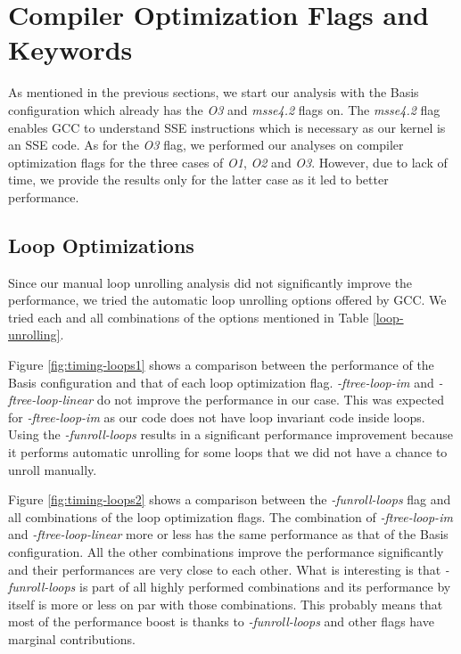 \documentclass{article}
\begin{document}
\section{Compiler Optimization Flags and Keywords}

As mentioned in the previous sections, we start our analysis with the Basis configuration which already has the \textit{O3} and \textit{msse4.2} flags on. The \textit{msse4.2} flag enables GCC to understand SSE instructions which is necessary as our kernel is an SSE code. As for the \textit{O3} flag, we performed our analyses on compiler optimization flags for the three cases of \textit{O1},  \textit{O2} and \textit{O3}. However, due to lack of time, we provide the results only for the latter case as it led to better performance.

\subsection{Loop Optimizations}

Since our manual loop unrolling analysis did not significantly improve the performance, we tried the automatic loop unrolling options offered by GCC. We tried each and all combinations of the options mentioned in Table \ref{loop-unrolling}. 

Figure \ref{fig:timing-loops1} shows a comparison between the performance of the Basis configuration and that of each loop optimization flag. \textit{-ftree-loop-im} and \textit{-ftree-loop-linear} do not improve the performance in our case. This was expected for  \textit{-ftree-loop-im} as our code does not have loop invariant code inside loops. Using the \textit{-funroll-loops} results in a significant performance improvement because it performs automatic unrolling for some loops that we did not have a chance to unroll manually. 

Figure \ref{fig:timing-loops2} shows a comparison between the \textit{-funroll-loops} flag and all combinations of the loop optimization flags. The combination of \textit{-ftree-loop-im} and \textit{-ftree-loop-linear} more or less has the same performance as that of the Basis configuration. All the other combinations improve the performance significantly and their performances are very close to each other. What is interesting is that \textit{-funroll-loops} is part of all highly performed combinations and its performance by itself is more or less on par with those combinations. This probably means that most of the performance boost is thanks to \textit{-funroll-loops} and other flags have marginal contributions.
\end{document}
